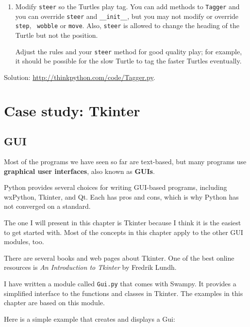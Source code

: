 \documentclass[10pt]{book}
\begin{document}
\begin{exercise}
\begin{enumerate}
\item Modify {\tt steer} so the Turtles play tag.  You can add methods
  to {\tt Tagger} and you can override {\tt steer} and
  \verb"__init__", but you may not modify or override {\tt step}, {\tt
    wobble} or {\tt move}.  Also, {\tt steer} is allowed to change the
  heading of the Turtle but not the position.

Adjust the rules and your {\tt steer} method for good quality play;
for example, it should be possible for the slow Turtle to tag the
faster Turtles eventually.

\end{enumerate}

Solution: \url{http://thinkpython.com/code/Tagger.py}.
\end{exercise}



\chapter{Case study: Tkinter}
\label{tkinter}

\section{GUI}

Most of the programs we have seen so far are text-based, but
many programs use {\bf graphical user interfaces}, also
known as {\bf GUIs}.

Python provides several choices for writing GUI-based programs,
including wxPython, Tkinter, and Qt.  Each has pros and cons, which
is why Python has not converged on a standard.

The one I will present in this chapter is Tkinter because I think
it is the easiest to get started with.  Most of the concepts
in this chapter apply to the other GUI modules, too.

There are several books and web pages about Tkinter.  One of
the best online resources is {\em An Introduction to Tkinter}
by Fredrik Lundh.

I have written a module called {\tt Gui.py} that comes with
Swampy.  It provides a simplified interface to the functions
and classes in Tkinter.  The examples in this chapter are
based on this module.

Here is a simple example that creates and displays a Gui:
\end{document}
